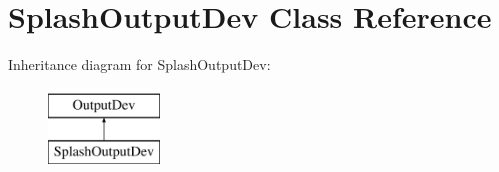 \hypertarget{class_splash_output_dev}{}\section{Splash\+Output\+Dev Class Reference}
\label{class_splash_output_dev}
Inheritance diagram for Splash\+Output\+Dev\+:\begin{figure}[H]
\begin{center}
\leavevmode
\includegraphics[height=2.000000cm]{class_splash_output_dev}
\end{center}
\end{figure}
